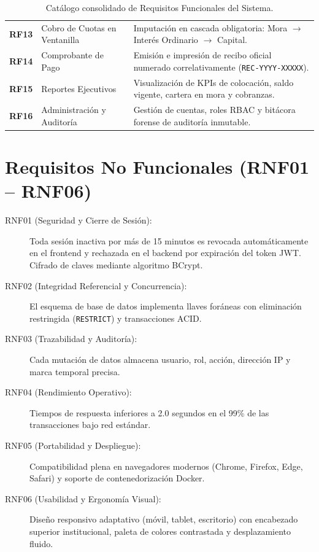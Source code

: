 \documentclass[11pt,letterpaper]{report}
\begin{document}
\begin{table}[htbp]
\begin{tabularx}{\textwidth}{l l p{8.5cm}}
\textbf{RF13} & Cobro de Cuotas en Ventanilla & Imputación en cascada obligatoria: Mora $\rightarrow$ Interés Ordinario $\rightarrow$ Capital. \\
\textbf{RF14} & Comprobante de Pago & Emisión e impresión de recibo oficial numerado correlativamente (\texttt{REC-YYYY-XXXXX}). \\
\textbf{RF15} & Reportes Ejecutivos & Visualización de KPIs de colocación, saldo vigente, cartera en mora y cobranzas. \\
\textbf{RF16} & Administración y Auditoría & Gestión de cuentas, roles RBAC y bitácora forense de auditoría inmutable. \\
\bottomrule
\end{tabularx}
\caption{Catálogo consolidado de Requisitos Funcionales del Sistema.}
\end{table}

\section{Requisitos No Funcionales (RNF01 -- RNF06)}
\begin{description}
    \item[RNF01 (Seguridad y Cierre de Sesión):] Toda sesión inactiva por más de 15 minutos es revocada automáticamente en el frontend y rechazada en el backend por expiración del token JWT. Cifrado de claves mediante algoritmo BCrypt.
    \item[RNF02 (Integridad Referencial y Concurrencia):] El esquema de base de datos implementa llaves foráneas con eliminación restringida (\texttt{RESTRICT}) y transacciones ACID.
    \item[RNF03 (Trazabilidad y Auditoría):] Cada mutación de datos almacena usuario, rol, acción, dirección IP y marca temporal precisa.
    \item[RNF04 (Rendimiento Operativo):] Tiempos de respuesta inferiores a 2.0 segundos en el 99\% de las transacciones bajo red estándar.
    \item[RNF05 (Portabilidad y Despliegue):] Compatibilidad plena en navegadores modernos (Chrome, Firefox, Edge, Safari) y soporte de contenedorización Docker.
    \item[RNF06 (Usabilidad y Ergonomía Visual):] Diseño responsivo adaptativo (móvil, tablet, escritorio) con encabezado superior institucional, paleta de colores contrastada y desplazamiento fluido.
\end{description}
\end{document}
